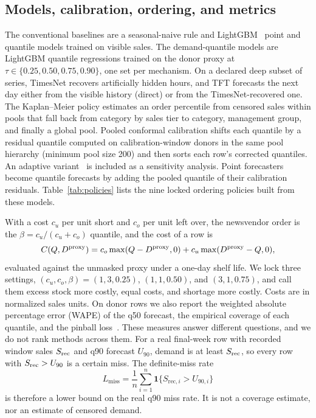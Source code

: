 \subsection{Models, calibration, ordering, and metrics}
\label{sec:models}

The conventional baselines are a seasonal-naive rule and LightGBM~\cite{ke2017lightgbm} point and quantile models trained on visible sales. The demand-quantile models are LightGBM quantile regressions trained on the donor proxy at $\tau\in\{0.25,0.50,0.75,0.90\}$, one set per mechanism. On a declared deep subset of series, TimesNet recovers artificially hidden hours, and TFT forecasts the next day either from the visible history (direct) or from the TimesNet-recovered one. The Kaplan--Meier policy estimates an order percentile from censored sales within pools that fall back from category by sales tier to category, management group, and finally a global pool. Pooled conformal calibration shifts each quantile by a residual quantile computed on calibration-window donors in the same pool hierarchy (minimum pool size 200) and then sorts each row's corrected quantiles. An adaptive variant~\cite{gibbs2021adaptive} is included as a sensitivity analysis. Point forecasters become quantile forecasts by adding the pooled quantile of their calibration residuals. Table~\ref{tab:policies} lists the nine locked ordering policies built from these models.

With a cost $c_u$ per unit short and $c_o$ per unit left over, the newsvendor order is the $\beta=c_u/(c_u+c_o)$ quantile, and the cost of a row is
\begin{equation}
C(Q,D^{\mathrm{proxy}})=c_o\max(Q-D^{\mathrm{proxy}},0)+c_u\max(D^{\mathrm{proxy}}-Q,0),
\label{eq:cost}
\end{equation}
evaluated against the unmasked proxy under a one-day shelf life. We lock three settings, $(c_u,c_o,\beta)=(1,3,0.25)$, $(1,1,0.50)$, and $(3,1,0.75)$, and call them excess stock more costly, equal costs, and shortage more costly. Costs are in normalized sales units. On donor rows we also report the weighted absolute percentage error (WAPE) of the q50 forecast, the empirical coverage of each quantile, and the pinball loss~\cite{koenker1978regression}. These measures answer different questions, and we do not rank methods across them. For a real final-week row with recorded window sales $S_{\mathrm{rec}}$ and q90 forecast $U_{90}$, demand is at least $S_{\mathrm{rec}}$, so every row with $S_{\mathrm{rec}}>U_{90}$ is a certain miss. The definite-miss rate
\begin{equation}
L_{\mathrm{miss}}=\frac{1}{n}\sum_{i=1}^{n}\mathbf{1}\{S_{\mathrm{rec},i}>U_{90,i}\}
\label{eq:miss}
\end{equation}
is therefore a lower bound on the real q90 miss rate. It is not a coverage estimate, nor an estimate of censored demand.
